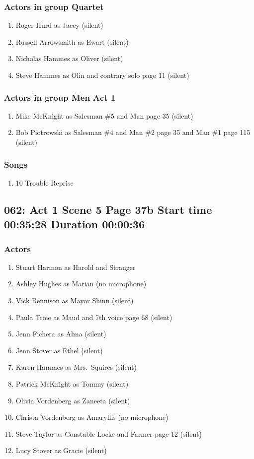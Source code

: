 \subsubsection{Actors in group Quartet}
\begin{enumerate}
\item Roger Hurd as Jacey (silent)
\item Russell Arrowsmith as Ewart (silent)
\item Nicholas Hammes as Oliver (silent)
\item Steve Hammes as Olin and contrary solo page 11 (silent)
\end{enumerate}
\subsubsection{Actors in group Men Act 1}
\begin{enumerate}
\item Mike McKnight as Salesman \#5 and Man page 35 (silent)
\item Bob Piotrowski as Salesman \#4 and Man \#2 page 35 and Man \#1 page 115 (silent)
\end{enumerate}

\subsubsection{Songs}
\begin{enumerate}
\item 10 Trouble Reprise
\end{enumerate}
\subsection{062: Act 1 Scene 5 Page 37b Start time 00:35:28 Duration 00:00:36}

\subsubsection{Actors}
\begin{enumerate}
\item Stuart Harmon as Harold and Stranger
\item Ashley Hughes as Marian (no microphone)
\item Vick Bennison as Mayor Shinn (silent)
\item Paula Troie as Maud and 7th voice page 68 (silent)
\item Jenn Fichera as Alma (silent)
\item Jenn Stover as Ethel (silent)
\item Karen Hammes as Mrs.~Squires (silent)
\item Patrick McKnight as Tommy (silent)
\item Olivia Vordenberg as Zaneeta (silent)
\item Christa Vordenberg as Amaryllis (no microphone)
\item Steve Taylor as Constable Locke and Farmer page 12 (silent)
\item Lucy Stover as Gracie (silent)
\end{enumerate}

